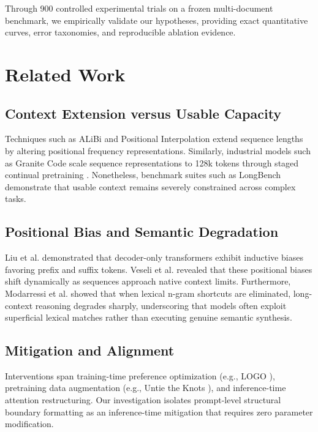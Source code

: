 \documentclass[manuscript,screen,oneside]{acmart}
\begin{document}
Through 900 controlled experimental trials on a frozen multi-document benchmark, we empirically validate our hypotheses, providing exact quantitative curves, error taxonomies, and reproducible ablation evidence.

\section{Related Work}\label{sec:related}
\subsection{Context Extension versus Usable Capacity}
Techniques such as ALiBi \cite{press2022train} and Positional Interpolation \cite{chen2023extending} extend sequence lengths by altering positional frequency representations. Similarly, industrial models such as Granite Code scale sequence representations to 128k tokens through staged continual pretraining \cite{stallone2024granite}. Nonetheless, benchmark suites such as LongBench \cite{bai2024longbench} demonstrate that usable context remains severely constrained across complex tasks.

\subsection{Positional Bias and Semantic Degradation}
Liu et al. \cite{liu2024lost} demonstrated that decoder-only transformers exhibit inductive biases favoring prefix and suffix tokens. Veseli et al. \cite{veseli2025positional} revealed that these positional biases shift dynamically as sequences approach native context limits. Furthermore, Modarressi et al. \cite{modarressi2025nolima} showed that when lexical n-gram shortcuts are eliminated, long-context reasoning degrades sharply, underscoring that models often exploit superficial lexical matches rather than executing genuine semantic synthesis.

\subsection{Mitigation and Alignment}
Interventions span training-time preference optimization (e.g., LOGO \cite{tang2025logo}), pretraining data augmentation (e.g., Untie the Knots \cite{tian2025untie}), and inference-time attention restructuring. Our investigation isolates prompt-level structural boundary formatting as an inference-time mitigation that requires zero parameter modification.
\end{document}

